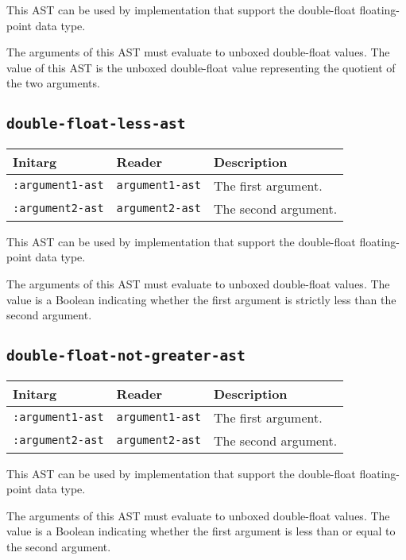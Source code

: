 This AST can be used by implementation that support the double-float
floating-point data type.  

The arguments of this AST must evaluate to unboxed double-float
values.  The value of this AST is the unboxed double-float value
representing the quotient of the two arguments.

\subsection{\texttt{double-float-less-ast}}
\label{sec-ast-double-float-less}

\begin{tabular}{|l|l|l|}
\hline
Initarg & Reader & Description\\
\hline\hline
\texttt{:argument1-ast} & \texttt{argument1-ast} & The first argument.\\
\hline
\texttt{:argument2-ast} & \texttt{argument2-ast} & The second argument.\\
\hline
\end{tabular}

This AST can be used by implementation that support the double-float
floating-point data type.  

The arguments of this AST must evaluate to unboxed double-float
values.  The value is a Boolean indicating whether the first argument
is strictly less than the second argument.

\subsection{\texttt{double-float-not-greater-ast}}
\label{sec-ast-double-float-not-greater}

\begin{tabular}{|l|l|l|}
\hline
Initarg & Reader & Description\\
\hline\hline
\texttt{:argument1-ast} & \texttt{argument1-ast} & The first argument.\\
\hline
\texttt{:argument2-ast} & \texttt{argument2-ast} & The second argument.\\
\hline
\end{tabular}

This AST can be used by implementation that support the double-float
floating-point data type.  

The arguments of this AST must evaluate to unboxed double-float
values.  The value is a Boolean indicating whether the first argument
is less than or equal to the second argument.

